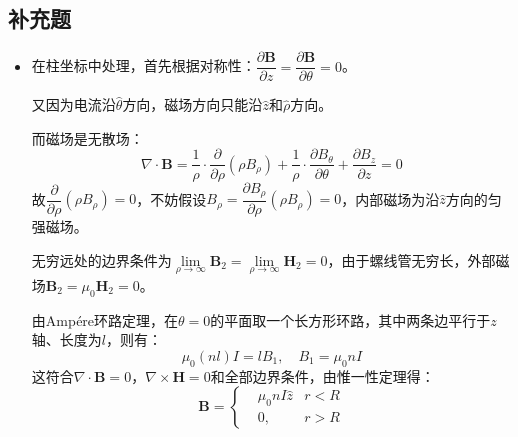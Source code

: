 \documentclass[a4paper,fontset=none]{ctexart}
\begin{document}
    \subsection*{补充题}

    \begin{itemize}

    \item[2.]
    在柱坐标中处理，首先根据对称性：$\dfrac{\partial\bm{B}}{\partial z}=\dfrac{\partial\bm{B}}{\partial\theta}=0$。

    又因为电流沿$\hat{\theta}$方向，磁场方向只能沿$\hat{z}$和$\hat{\rho}$方向。

    而磁场是无散场：
    \[
    \nabla\cdot\bm{B} = \frac{1}{\rho}\cdot\frac{\partial}{\partial\rho}(\rho B_\rho) + \frac{1}{\rho}\cdot\frac{\partial B_\theta}{\partial\theta} + \frac{\partial B_z}{\partial z} = 0
    \]
    故$\dfrac{\partial}{\partial\rho}(\rho B_\rho)=0$，不妨假设$B_\rho=\dfrac{\partial B_\rho}{\partial\rho}(\rho B_\rho)=0$，内部磁场为沿$\hat{z}$方向的匀强磁场。

    无穷远处的边界条件为$\lim\limits_{\rho\to\infty}\bm{B}_2=\lim\limits_{\rho\to\infty}\bm{H}_2=0$，由于螺线管无穷长，外部磁场$\bm{B}_2=\mu_0\textbf{H}_2=0$。

    由Amp\'{e}re环路定理，在$\theta=0$的平面取一个长方形环路，其中两条边平行于$z$轴、长度为$l$，则有：
    \[
    \mu_0(nl)I = lB_1,\quad B_1 = \mu_0nI
    \]
    这符合$\nabla\cdot\bm{B}=0$，$\nabla\times\bm{H}=0$和全部边界条件，由惟一性定理得：
    \[
    \bm{B} =
    \left\{
        \begin{aligned}
            &\mu_0nI\hat{z} &r<R \\
            &0,\quad &r>R
        \end{aligned}
    \right.
    \]


\end{itemize}
\end{document}
